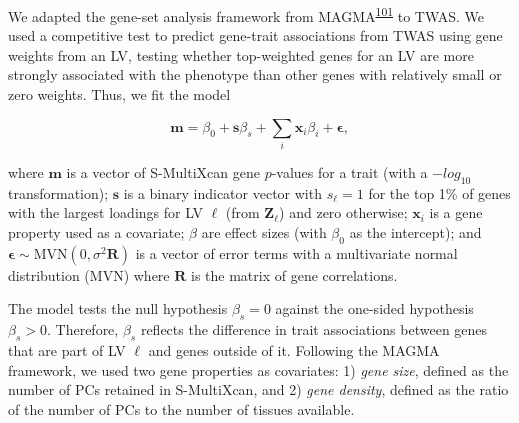 \documentclass[
  a4paper,
]{article}
\newcommand{\bm}[1]{\boldsymbol{#1}}
\begin{document}
We adapted the gene-set analysis framework from MAGMA\textsuperscript{\protect\hyperlink{ref-19XiXgYmd}{101}} to TWAS.
We used a competitive test to predict gene-trait associations from TWAS using gene weights from an LV, testing whether top-weighted genes for an LV are more strongly associated with the phenotype than other genes with relatively small or zero weights.
Thus, we fit the model

\begin{equation}
\mathbf{m}=\beta_{0} + \mathbf{s} \beta_{s} + \sum_{i} \mathbf{x}_{i} \beta_{i} + \bm{\epsilon},
\label{eq:reg:model}\end{equation}

where \(\mathbf{m}\) is a vector of S-MultiXcan gene \(p\)-values for a trait (with a \(-log_{10}\) transformation);
\(\mathbf{s}\) is a binary indicator vector with \(s_{\ell}=1\) for the top 1\% of genes with the largest loadings for LV \(\ell\) (from \(\mathbf{Z}_{\ell}\)) and zero otherwise;
\(\mathbf{x}_{i}\) is a gene property used as a covariate;
\(\beta\) are effect sizes (with \(\beta_{0}\) as the intercept);
and \(\bm{\epsilon} \sim \mathrm{MVN}(0, \sigma^{2} \mathbf{R})\) is a vector of error terms with a multivariate normal distribution (MVN) where \(\mathbf{R}\) is the matrix of gene correlations.

The model tests the null hypothesis \(\beta_{s} = 0\) against the one-sided hypothesis \(\beta_{s} > 0\).
Therefore, \(\beta_{s}\) reflects the difference in trait associations between genes that are part of LV \(\ell\) and genes outside of it.
Following the MAGMA framework, we used two gene properties as covariates:
1) \emph{gene size}, defined as the number of PCs retained in S-MultiXcan,
and 2) \emph{gene density}, defined as the ratio of the number of PCs to the number of tissues available.
\end{document}
